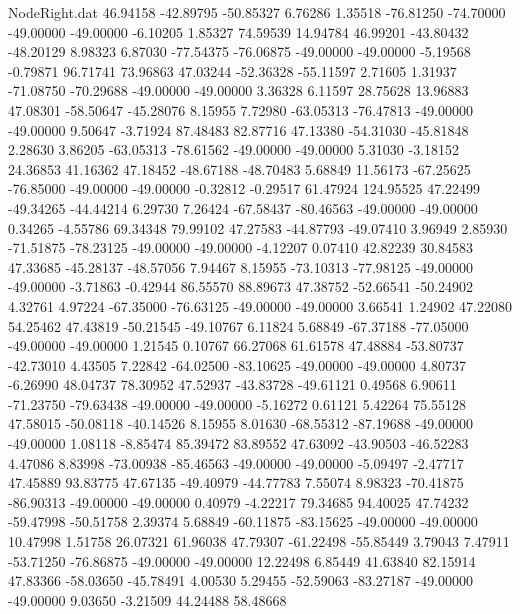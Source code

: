 \begin{filecontents}{NodeRight.dat}
  46.94158  -42.89795  -50.85327     6.76286    1.35518  -76.81250  -74.70000  -49.00000  -49.00000   -6.10205    1.85327   74.59539   14.94784
  46.99201  -43.80432  -48.20129     8.98323    6.87030  -77.54375  -76.06875  -49.00000  -49.00000   -5.19568   -0.79871   96.71741   73.96863
  47.03244  -52.36328  -55.11597     2.71605    1.31937  -71.08750  -70.29688  -49.00000  -49.00000    3.36328    6.11597   28.75628   13.96883
  47.08301  -58.50647  -45.28076     8.15955    7.72980  -63.05313  -76.47813  -49.00000  -49.00000    9.50647   -3.71924   87.48483   82.87716
  47.13380  -54.31030  -45.81848     2.28630    3.86205  -63.05313  -78.61562  -49.00000  -49.00000    5.31030   -3.18152   24.36853   41.16362
  47.18452  -48.67188  -48.70483     5.68849   11.56173  -67.25625  -76.85000  -49.00000  -49.00000   -0.32812   -0.29517   61.47924  124.95525
  47.22499  -49.34265  -44.44214     6.29730    7.26424  -67.58437  -80.46563  -49.00000  -49.00000    0.34265   -4.55786   69.34348   79.99102
  47.27583  -44.87793  -49.07410     3.96949    2.85930  -71.51875  -78.23125  -49.00000  -49.00000   -4.12207    0.07410   42.82239   30.84583
  47.33685  -45.28137  -48.57056     7.94467    8.15955  -73.10313  -77.98125  -49.00000  -49.00000   -3.71863   -0.42944   86.55570   88.89673
  47.38752  -52.66541  -50.24902     4.32761    4.97224  -67.35000  -76.63125  -49.00000  -49.00000    3.66541    1.24902   47.22080   54.25462
  47.43819  -50.21545  -49.10767     6.11824    5.68849  -67.37188  -77.05000  -49.00000  -49.00000    1.21545    0.10767   66.27068   61.61578
  47.48884  -53.80737  -42.73010     4.43505    7.22842  -64.02500  -83.10625  -49.00000  -49.00000    4.80737   -6.26990   48.04737   78.30952
  47.52937  -43.83728  -49.61121     0.49568    6.90611  -71.23750  -79.63438  -49.00000  -49.00000   -5.16272    0.61121    5.42264   75.55128
  47.58015  -50.08118  -40.14526     8.15955    8.01630  -68.55312  -87.19688  -49.00000  -49.00000    1.08118   -8.85474   85.39472   83.89552
  47.63092  -43.90503  -46.52283     4.47086    8.83998  -73.00938  -85.46563  -49.00000  -49.00000   -5.09497   -2.47717   47.45889   93.83775
  47.67135  -49.40979  -44.77783     7.55074    8.98323  -70.41875  -86.90313  -49.00000  -49.00000    0.40979   -4.22217   79.34685   94.40025
  47.74232  -59.47998  -50.51758     2.39374    5.68849  -60.11875  -83.15625  -49.00000  -49.00000   10.47998    1.51758   26.07321   61.96038
  47.79307  -61.22498  -55.85449     3.79043    7.47911  -53.71250  -76.86875  -49.00000  -49.00000   12.22498    6.85449   41.63840   82.15914
  47.83366  -58.03650  -45.78491     4.00530    5.29455  -52.59063  -83.27187  -49.00000  -49.00000    9.03650   -3.21509   44.24488   58.48668

\end{filecontents}
